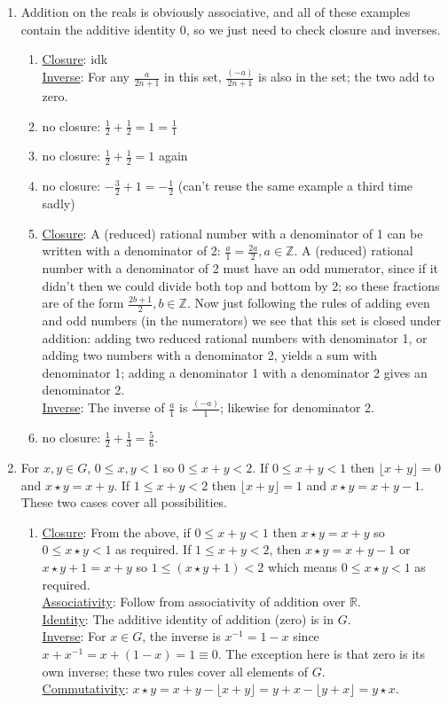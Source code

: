 \documentclass[]{article}
\newcommand{\bbz}{\mathbb{Z}}
\newcommand{\bbr}{\mathbb{R}}
\begin{document}
\begin{enumerate}
\item Addition on the reals is obviously associative, and all of these examples contain the additive identity $0$, so we just need to check closure and inverses.\begin{enumerate}
\item \underline{Closure}: {\color{red} idk} \\
\underline{Inverse}: For any $\frac{a}{2n+1}$ in this set, $\frac{(-a)}{2n+1}$ is also in the set; the two add to zero.
\item no closure: $\frac{1}{2} + \frac{1}{2} = 1 = \frac{1}{1}$ 
\item no closure: $\frac{1}{2} + \frac{1}{2} = 1$ again
\item no closure: $-\frac{3}{2} + 1 = -\frac{1}{2}$ (can't reuse the same example a third time sadly)
\item \underline{Closure}: A (reduced) rational number with a denominator of 1 can be written with a denominator of 2: $\frac{a}{1} = \frac{2a}{2}, a\in\bbz$. A (reduced) rational number with a denominator of 2 must have an odd numerator, since if it didn't then we could divide both top and bottom by 2; so these fractions are of the form $\frac{2b+1}{2}, b\in\bbz$. Now just following the rules of adding even and odd numbers (in the numerators) we see that this set is closed under addition: adding two reduced rational numbers with denominator 1, or adding two numbers with a denominator 2, yields a sum with denominator 1; adding a denominator 1 with a denominator 2 gives an denominator 2. \\
\underline{Inverse}: The inverse of $\frac{a}{1}$ is $\frac{(-a)}{1}$; likewise for denominator 2.
\item no closure: $\frac{1}{2} + \frac{1}{3} = \frac{5}{6}$.
\end{enumerate}


\item For $x,y\in G$, $0 \leq x,y < 1$ so $0 \leq x+y < 2$. If $0\leq x+y < 1$ then $\lfloor x+y \rfloor = 0$ and $x\star y = x+y$. If $1\leq x+y < 2$ then $\lfloor x+y \rfloor = 1$ and $x\star y = x+y-1$. These two cases cover all possibilities.
\begin{enumerate}
\item \underline{Closure}: From the above, if $0\leq x+y < 1$ then $x\star y = x+y$ so $0\leq x\star y < 1$ as required. If $1\leq x+y < 2$, then $x\star y = x+y-1$ or $x\star y + 1 = x+y$ so $1\leq (x\star y + 1) < 2$ which means $0\leq x\star y < 1$ as required. \\
\underline{Associativity}: Follow from associativity of addition over $\bbr$.\\ 
\underline{Identity}: The additive identity of addition (zero) is in $G$.\\
\underline{Inverse}: For $x \in G$, the inverse is $x^{-1} = 1-x$ since $x+x^{-1} = x + (1-x) = 1 \equiv 0$. The exception here is that zero is its own inverse; these two rules cover all elements of $G$.\\
\underline{Commutativity}: $x\star y = x + y - \lfloor x+y \rfloor = y + x - \lfloor y+x \rfloor = y\star x$.
\end{enumerate}



\end{enumerate}
\end{document}
